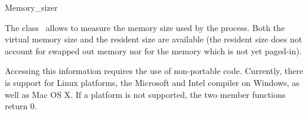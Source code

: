 
\begin{ccRefClass}{Memory_sizer}

\ccDefinition

The class \ccRefName\ allows to measure the memory size used by the process.
Both the virtual memory size and the resident size are available (the resident
size does not account for swapped out memory nor for the memory which is not
yet paged-in).


\ccTypes
\ccThreeToTwo


\ccCreation

\ccPropagateThreeToTwoColumns


\ccOperations

\ccGlue
{}


\ccImplementation

Accessing this information requires the use of non-portable code.
Currently, there is support for Linux platforms, the Microsoft and Intel
compiler on Windows, as well as Mac OS X.  If a platform is not supported, the
two member functions return 0.

\end{ccRefClass}
